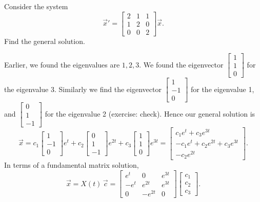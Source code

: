 \begin{example}
Consider the system
\begin{equation*}
{\vec{x}}'
=
\begin{bmatrix}
2 & 1 & 1 \\
1 & 2 & 0 \\
0 & 0 & 2
\end{bmatrix}
\vec{x} .
\end{equation*}
Find the general solution.

Earlier, we found the eigenvalues are $1,2,3$.  We found the eigenvector
$\left[ \begin{smallmatrix} 1 \\ 1 \\ 0 \end{smallmatrix} \right]$
for the eigenvalue 3.  Similarly
we find the eigenvector 
$\left[ \begin{smallmatrix} 1 \\ -1 \\ 0 \end{smallmatrix} \right]$
for the eigenvalue 1, and 
$\left[ \begin{smallmatrix} 0 \\ 1 \\ -1 \end{smallmatrix} \right]$
for the eigenvalue 2 (exercise: check).
Hence our general solution is
\begin{equation*}
\vec{x} =
c_1
\begin{bmatrix}
1 \\ -1 \\ 0
\end{bmatrix}
e^t
+
c_2
\begin{bmatrix}
0 \\ 1 \\ -1
\end{bmatrix}
e^{2t}
+
c_3
\begin{bmatrix}
1 \\ 1 \\ 0
\end{bmatrix}
e^{3t} 
=
\begin{bmatrix}
c_1 e^t+c_3 e^{3t} \\ -c_1 e^t + c_2 e^{2t} + c_3 e^{3t} \\ - c_2 e^{2t}
\end{bmatrix} .
\end{equation*}
In terms of a fundamental matrix solution,
\begin{equation*}
\vec{x} = X(t)\, \vec{c}
=
\begin{bmatrix}
e^t & 0 & e^{3t} \\
-e^t & e^{2t} & e^{3t} \\
0 & -e^{2t} & 0
\end{bmatrix}
\begin{bmatrix}
c_1 \\ c_2 \\ c_3
\end{bmatrix} .
\end{equation*}
\end{example}

